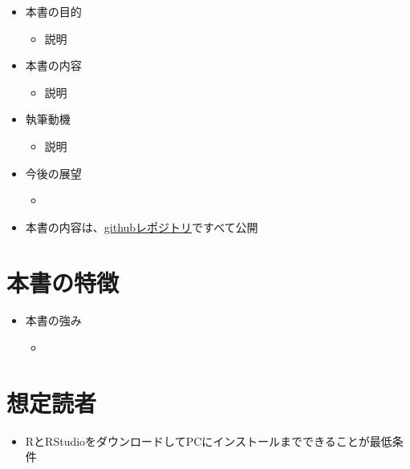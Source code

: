 \documentclass[
  b5paper,
  xelatex, ja=standard]{bxjsbook}
\providecommand{\tightlist}{%
  \setlength{\itemsep}{0pt}\setlength{\parskip}{0pt}}\usepackage{longtable,booktabs,array}
\begin{document}
\begin{itemize}
\tightlist
\item
  本書の目的

  \begin{itemize}
  \tightlist
  \item
    説明
  \end{itemize}
\item
  本書の内容

  \begin{itemize}
  \tightlist
  \item
    説明
  \end{itemize}
\item
  執筆動機

  \begin{itemize}
  \tightlist
  \item
    説明
  \end{itemize}
\item
  今後の展望

  \begin{itemize}
  \tightlist
  \item
  \end{itemize}
\item
  本書の内容は、\href{url}{githubレポジトリ}ですべて公開
\end{itemize}

\section*{本書の特徴}\label{ux672cux66f8ux306eux7279ux5fb4}


\begin{itemize}
\tightlist
\item
  本書の強み

  \begin{itemize}
  \tightlist
  \item
  \end{itemize}
\end{itemize}

\section*{想定読者}\label{ux60f3ux5b9aux8aadux8005}


\begin{itemize}
\tightlist
\item
  RとRStudioをダウンロードしてPCにインストールまでできることが最低条件
\end{itemize}
\end{document}

